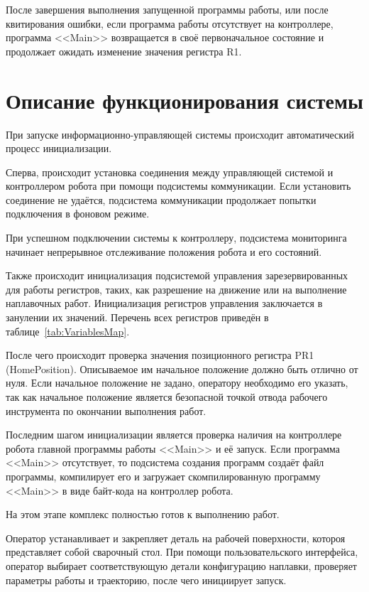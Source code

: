 После завершения выполнения запущенной программы работы, или после квитирования ошибки, если программа работы отсутствует на контроллере, программа <<Main>> возвращается в своё первоначальное состояние и продолжает ожидать изменение значения регистра R1.


\section{Описание функционирования системы}
При запуске информационно-управляющей системы происходит автоматический процесс инициализации.

Сперва, происходит установка соединения между управляющей системой и контроллером робота при помощи подсистемы коммуникации.
Если установить соединение не удаётся, подсистема коммуникации продолжает попытки подключения в фоновом режиме.

При успешном подключении системы к контроллеру, подсистема мониторинга начинает непрерывное отслеживание положения робота и его состояний.

Также происходит инициализация подсистемой управления зарезервированных для работы регистров, таких, как разрешение на движение или на выполнение наплавочных работ.
Инициализация регистров управления заключается в занулении их значений.
Перечень всех регистров приведён в таблице~\ref{tab:VariablesMap}.

После чего происходит проверка значения позиционного регистра PR1 (HomePosition).
Описываемое им начальное положение должно быть отлично от нуля.
Если начальное положение не задано, оператору необходимо его указать, так как начальное положение является безопасной точкой отвода рабочего инструмента по окончании выполнения работ.

Последним шагом инициализации является проверка наличия на контроллере робота главной программы работы <<Main>> и её запуск.
Если программа <<Main>> отсутствует, то подсистема создания программ создаёт файл программы, компилирует его и загружает скомпилированную программу <<Main>> в виде байт-кода на контроллер робота.

На этом этапе комплекс полностью готов к выполнению работ.

Оператор устанавливает и закрепляет деталь на рабочей поверхности, котороя представляет собой сварочный стол.
При помощи пользовательского интерфейса, оператор выбирает соответствующую детали конфигурацию наплавки, проверяет параметры работы и траекторию, после чего инициирует запуск.

